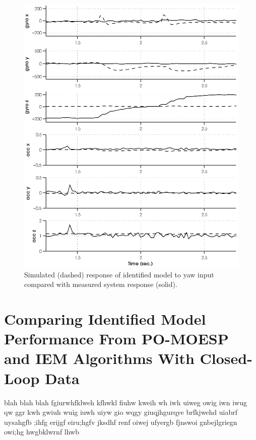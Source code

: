 \newpage
\begin{figure}[htb!]
	\centering
	\includegraphics{../fig/sim_1760_yaw.eps}
	\caption{Simulated (dashed) response of identified model to yaw input compared with measured system response (solid).}
	\label{sim_1760_yaw}
\end{figure}\clearpage


\newpage
\section{Comparing Identified Model Performance From PO-MOESP and IEM Algorithms With Closed-Loop Data}
blah blah blah fgiurwhfklweh kfhwkl fiuhw kweih wh iwh uiweg owig iwn iwug qw ggr kwh gwiuh wuig iuwh uiyw gio wqgy  giuqjhgurqye brfkjwehd uiabrf uysahgfb ;ihfg erijgf eiru;hgfv jksdhf renf oiwej ufyergb fjnswoi gnbejlgriegn owi;hg hwgbklwrnf lhwb

